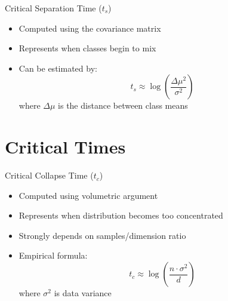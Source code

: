 \documentclass[aspectratio=169]{beamer}
\begin{document}
\begin{frame}{Critical Separation Time ($t_s$)}
    \begin{itemize}
        \item Computed using the covariance matrix
        \item Represents when classes begin to mix
        \item Can be estimated by:
        \begin{equation}
            t_s \approx \log\left(\frac{\Delta\mu^2}{\sigma^2}\right)
        \end{equation}
        where $\Delta\mu$ is the distance between class means
    \end{itemize}
    
    \begin{center}
    \end{center}
\end{frame}

\section{Critical Times}
\begin{frame}{Critical Collapse Time ($t_c$)}
    \begin{itemize}
        \item Computed using volumetric argument
        \item Represents when distribution becomes too concentrated
        \item Strongly depends on samples/dimension ratio
        \item Empirical formula:
        \begin{equation}
            t_c \approx \log\left(\frac{n \cdot \sigma^2}{d}\right)
        \end{equation}
        where $\sigma^2$ is data variance
    \end{itemize}
    
    \begin{center}
    \end{center}
\end{frame}
\end{document}
